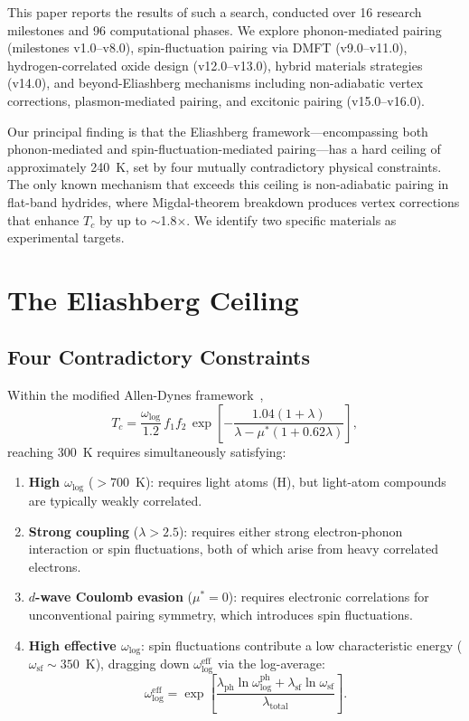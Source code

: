 \documentclass[aps,prb,reprint,superscriptaddress,longbibliography]{revtex4-2}
\begin{document}
This paper reports the results of such a search, conducted over 16 research milestones and 96 computational phases. We explore phonon-mediated pairing (milestones v1.0--v8.0), spin-fluctuation pairing via DMFT (v9.0--v11.0), hydrogen-correlated oxide design (v12.0--v13.0), hybrid materials strategies (v14.0), and beyond-Eliashberg mechanisms including non-adiabatic vertex corrections, plasmon-mediated pairing, and excitonic pairing (v15.0--v16.0).

Our principal finding is that the Eliashberg framework---encompassing both phonon-mediated and spin-fluctuation-mediated pairing---has a hard ceiling of approximately 240~K, set by four mutually contradictory physical constraints. The only known mechanism that exceeds this ceiling is non-adiabatic pairing in flat-band hydrides, where Migdal-theorem breakdown produces vertex corrections that enhance $T_c$ by up to $\sim$1.8$\times$. We identify two specific materials as experimental targets.

\section{The Eliashberg Ceiling}
\label{sec:ceiling}

\subsection{Four Contradictory Constraints}

Within the modified Allen-Dynes framework~\cite{AllenDynes1975},
\begin{equation}
    T_c = \frac{\omega_{\log}}{1.2}\, f_1 f_2\, \exp\!\left[-\frac{1.04(1+\lambda)}{\lambda - \mu^*(1+0.62\lambda)}\right],
    \label{eq:AD}
\end{equation}
reaching 300~K requires simultaneously satisfying:
\begin{enumerate}
    \item \textbf{High $\omega_{\log}$} ($>700$~K): requires light atoms (H), but light-atom compounds are typically weakly correlated.
    \item \textbf{Strong coupling} ($\lambda > 2.5$): requires either strong electron-phonon interaction or spin fluctuations, both of which arise from heavy correlated electrons.
    \item \textbf{$d$-wave Coulomb evasion} ($\mu^* = 0$): requires electronic correlations for unconventional pairing symmetry, which introduces spin fluctuations.
    \item \textbf{High effective $\omega_{\log}$}: spin fluctuations contribute a low characteristic energy ($\omega_{\mathrm{sf}} \sim 350$~K), dragging down $\omega_{\log}^{\mathrm{eff}}$ via the log-average:
    \begin{equation}
        \omega_{\log}^{\mathrm{eff}} = \exp\!\left[\frac{\lambda_{\mathrm{ph}}\ln\omega_{\log}^{\mathrm{ph}} + \lambda_{\mathrm{sf}}\ln\omega_{\mathrm{sf}}}{\lambda_{\mathrm{total}}}\right].
        \label{eq:omega-eff}
    \end{equation}
\end{enumerate}
\end{document}
